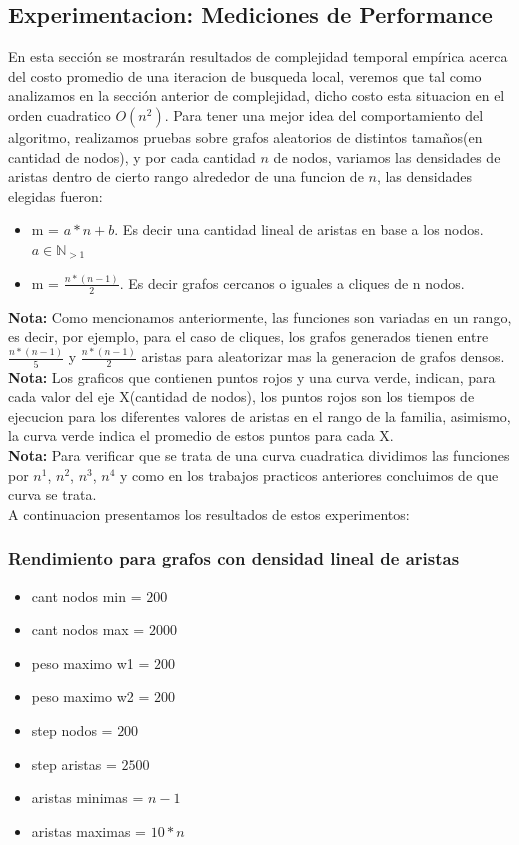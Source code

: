 \subsection{Experimentacion: Mediciones de Performance}
En esta secci\'on se mostrar\'an resultados de complejidad temporal emp\'irica acerca del costo promedio de una iteracion de busqueda local, veremos que tal como analizamos en la secci\'on anterior de complejidad, dicho costo esta situacion en el orden cuadratico $O(n^2)$.
Para tener una mejor idea del comportamiento del algoritmo, realizamos pruebas sobre grafos aleatorios de distintos tama\~nos(en cantidad de nodos), y por cada cantidad $n$ de nodos, variamos las densidades de aristas dentro de cierto rango alrededor de una funcion de $n$, las densidades elegidas fueron:
\begin{itemize}
	\item m = $a*n + b$. Es decir una cantidad lineal de aristas en base a los nodos. $a \in \mathbb{N}_{>1}$
	\item m = $\frac{n*(n-1)}{2}$. Es decir grafos cercanos o iguales a cliques de n nodos.
\end{itemize}


\textbf{Nota: } Como mencionamos anteriormente, las funciones son variadas en un rango, es decir, por ejemplo, para el caso de cliques, los grafos generados tienen entre $\frac{n*(n-1)}{5}$ y $\frac{n*(n-1)}{2}$ aristas para aleatorizar mas la generacion de grafos densos.\\

\textbf{Nota: } Los graficos que contienen puntos rojos y una curva verde, indican, para cada valor del eje X(cantidad de nodos), los puntos rojos son los tiempos de ejecucion para los diferentes valores de aristas en el rango de la familia, asimismo, la curva verde indica el promedio de estos puntos para cada X. \\
\textbf{Nota: }Para verificar que se trata de una curva cuadratica dividimos las funciones por $n^1$, $n^2$, $n^3$, $n^4$ y como en los trabajos practicos anteriores concluimos de que curva se trata.\\

A continuacion presentamos los resultados de estos experimentos:\\
\subsubsection{Rendimiento para grafos con densidad lineal de aristas}
\begin{itemize}
	\item cant nodos min = $200$
	\item cant nodos max = $2000$
	\item peso maximo w1 = $200$
	\item peso maximo w2 = $200$
	\item step nodos = $200$
	\item step aristas = $2500$
	\item aristas minimas = $n-1$
	\item aristas maximas = $10*n$
\end{itemize}								

